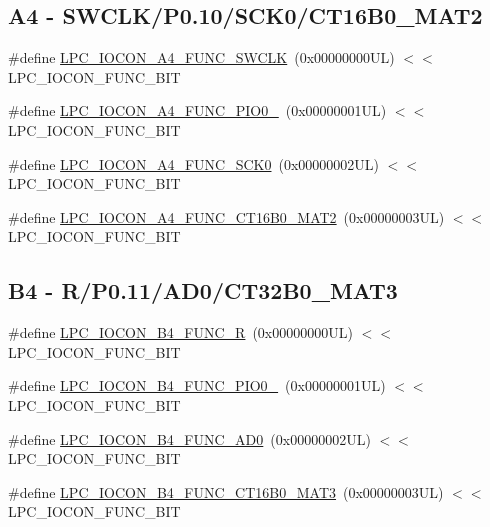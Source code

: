 \subsection*{A4 -\/ S\+W\+C\+L\+K/\+P0.10/\+S\+C\+K0/\+C\+T16\+B0\+\_\+\+M\+A\+T2}
\begin{DoxyCompactItemize}
\item 
\#define \hyperlink{group___l_p_c___i_o_c_o_n___l_p_c1102___p_i_n_e_s_ga71ead8726fc622434f9b4222c5778f60}{L\+P\+C\+\_\+\+I\+O\+C\+O\+N\+\_\+\+A4\+\_\+\+F\+U\+N\+C\+\_\+\+S\+W\+C\+LK}~(0x00000000\+U\+L) $<$$<$ L\+P\+C\+\_\+\+I\+O\+C\+O\+N\+\_\+\+F\+U\+N\+C\+\_\+\+B\+IT
\item 
\#define \hyperlink{group___l_p_c___i_o_c_o_n___l_p_c1102___p_i_n_e_s_ga87cbf13f8963feae2c0ed0efa8207443}{L\+P\+C\+\_\+\+I\+O\+C\+O\+N\+\_\+\+A4\+\_\+\+F\+U\+N\+C\+\_\+\+P\+I\+O0\+\_}~(0x00000001\+U\+L) $<$$<$ L\+P\+C\+\_\+\+I\+O\+C\+O\+N\+\_\+\+F\+U\+N\+C\+\_\+\+B\+IT
\item 
\#define \hyperlink{group___l_p_c___i_o_c_o_n___l_p_c1102___p_i_n_e_s_ga15f501e83044f160bad331f583ff0de2}{L\+P\+C\+\_\+\+I\+O\+C\+O\+N\+\_\+\+A4\+\_\+\+F\+U\+N\+C\+\_\+\+S\+C\+K0}~(0x00000002\+U\+L) $<$$<$ L\+P\+C\+\_\+\+I\+O\+C\+O\+N\+\_\+\+F\+U\+N\+C\+\_\+\+B\+IT
\item 
\#define \hyperlink{group___l_p_c___i_o_c_o_n___l_p_c1102___p_i_n_e_s_ga1d8317d7eab94b27acec3dd6566e1603}{L\+P\+C\+\_\+\+I\+O\+C\+O\+N\+\_\+\+A4\+\_\+\+F\+U\+N\+C\+\_\+\+C\+T16\+B0\+\_\+\+M\+A\+T2}~(0x00000003\+U\+L) $<$$<$ L\+P\+C\+\_\+\+I\+O\+C\+O\+N\+\_\+\+F\+U\+N\+C\+\_\+\+B\+IT
\end{DoxyCompactItemize}
\subsection*{B4 -\/ R/\+P0.11/\+A\+D0/\+C\+T32\+B0\+\_\+\+M\+A\+T3}
\begin{DoxyCompactItemize}
\item 
\#define \hyperlink{group___l_p_c___i_o_c_o_n___l_p_c1102___p_i_n_e_s_gaaf9bca59195d557afe0706795adde87b}{L\+P\+C\+\_\+\+I\+O\+C\+O\+N\+\_\+\+B4\+\_\+\+F\+U\+N\+C\+\_\+R}~(0x00000000\+U\+L) $<$$<$ L\+P\+C\+\_\+\+I\+O\+C\+O\+N\+\_\+\+F\+U\+N\+C\+\_\+\+B\+IT
\item 
\#define \hyperlink{group___l_p_c___i_o_c_o_n___l_p_c1102___p_i_n_e_s_ga772b2ba88b3dbd3457e63a5e41a52a05}{L\+P\+C\+\_\+\+I\+O\+C\+O\+N\+\_\+\+B4\+\_\+\+F\+U\+N\+C\+\_\+\+P\+I\+O0\+\_}~(0x00000001\+U\+L) $<$$<$ L\+P\+C\+\_\+\+I\+O\+C\+O\+N\+\_\+\+F\+U\+N\+C\+\_\+\+B\+IT
\item 
\#define \hyperlink{group___l_p_c___i_o_c_o_n___l_p_c1102___p_i_n_e_s_gae81155dea1ee849ae1324fbe36b9ebb7}{L\+P\+C\+\_\+\+I\+O\+C\+O\+N\+\_\+\+B4\+\_\+\+F\+U\+N\+C\+\_\+\+A\+D0}~(0x00000002\+U\+L) $<$$<$ L\+P\+C\+\_\+\+I\+O\+C\+O\+N\+\_\+\+F\+U\+N\+C\+\_\+\+B\+IT
\item 
\#define \hyperlink{group___l_p_c___i_o_c_o_n___l_p_c1102___p_i_n_e_s_gaf233dc12f01fa1193a2c8916c7b62960}{L\+P\+C\+\_\+\+I\+O\+C\+O\+N\+\_\+\+B4\+\_\+\+F\+U\+N\+C\+\_\+\+C\+T16\+B0\+\_\+\+M\+A\+T3}~(0x00000003\+U\+L) $<$$<$ L\+P\+C\+\_\+\+I\+O\+C\+O\+N\+\_\+\+F\+U\+N\+C\+\_\+\+B\+IT
\end{DoxyCompactItemize}
